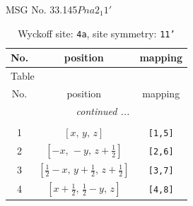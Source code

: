 \documentclass[fleqn,8pt]{jsarticle}
\begin{document}
\setcounter{MaxMatrixCols}{32}

\renewcommand{\tablename}{Table~}
\renewcommand{\figurename}{Figure~}
\begin{center}
\LARGE
MSG No. 33.145\quad$Pna2_{1}1'$
\end{center}
\renewcommand{\arraystretch}{1.2}
\begin{longtable}{ccc}
\caption{Wyckoff site: {\tt 4a}, site symmetry: {\tt 11'}}
 \\
 \hline \hline
No. & position & mapping \\ \hline \endfirsthead

\multicolumn{2}{l}{\tablename\ \thetable{}} \\
 \hline \hline
No. & position & mapping \\ \hline \endhead

 \hline \hline
\multicolumn{2}{r}{\footnotesize\it continued ...} \\ \endfoot

 \hline \hline
\multicolumn{2}{r}{} \\ \endlastfoot

1 & $\left[ x,\, y,\, z \right]$ & {\tt [1,5]} \\ \hline
2 & $\left[ - x,\, - y,\, z + \frac{1}{2} \right]$ & {\tt [2,6]} \\ \hline
3 & $\left[ \frac{1}{2} - x,\, y + \frac{1}{2},\, z + \frac{1}{2} \right]$ & {\tt [3,7]} \\ \hline
4 & $\left[ x + \frac{1}{2},\, \frac{1}{2} - y,\, z \right]$ & {\tt [4,8]} \\
\end{longtable}
\end{document}
